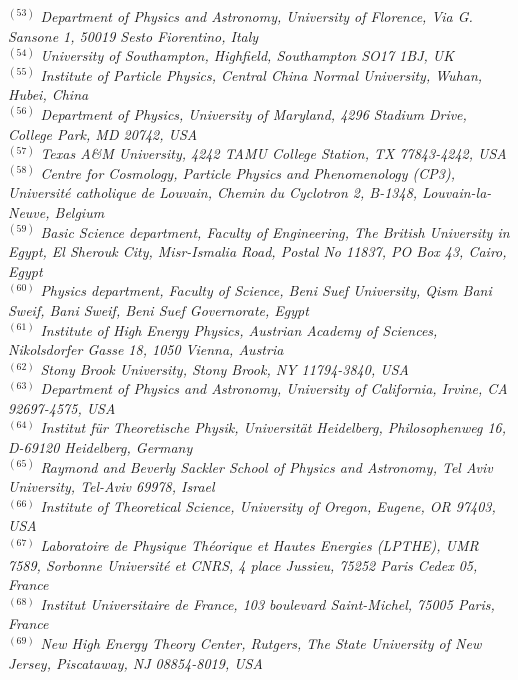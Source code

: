 {\begin{center}
$^{(53)}$ \emph{Department of Physics and Astronomy, University of Florence, Via G. Sansone 1, 50019 Sesto Fiorentino, Italy}\\
$^{(54)}$ \emph{University of Southampton, Highfield, Southampton SO17 1BJ, UK}\\
$^{(55)}$ \emph{Institute of Particle Physics, Central China Normal University, Wuhan, Hubei, China}\\
$^{(56)}$ \emph{Department of Physics, University of Maryland, 4296 Stadium Drive, College Park, MD  20742,  USA}\\
$^{(57)}$ \emph{Texas A\&M University, 4242 TAMU College Station, TX 77843-4242, USA}\\
$^{(58)}$ \emph{Centre for Cosmology, Particle Physics and Phenomenology (CP3), Universit\'e catholique de Louvain, Chemin du Cyclotron 2, B-1348, Louvain-la-Neuve, Belgium}\\
$^{(59)}$ \emph{Basic Science department, Faculty of Engineering, The British University in Egypt, El Sherouk City, Misr-Ismalia Road, Postal No 11837, PO Box 43, Cairo, Egypt}\\
$^{(60)}$ \emph{Physics department, Faculty of Science, Beni Suef University, Qism Bani Sweif, Bani Sweif, Beni Suef Governorate, Egypt}\\
$^{(61)}$ \emph{Institute of High Energy Physics, Austrian Academy of Sciences, Nikolsdorfer Gasse 18, 1050 Vienna, Austria}\\
$^{(62)}$ \emph{Stony Brook University, Stony Brook, NY 11794-3840, USA}\\
$^{(63)}$ \emph{Department of Physics and Astronomy, University of California, Irvine, CA 92697-4575, USA}\\
$^{(64)}$ \emph{Institut  f\"ur Theoretische Physik, Universit\"at Heidelberg, Philosophenweg 16, D-69120 Heidelberg, Germany}\\
$^{(65)}$ \emph{Raymond and Beverly Sackler School of Physics and Astronomy, Tel Aviv University, Tel-Aviv 69978, Israel}\\
$^{(66)}$ \emph{Institute of Theoretical Science, University of Oregon, Eugene, OR 97403, USA}\\
$^{(67)}$ \emph{Laboratoire de Physique Th\'eorique et Hautes Energies (LPTHE), UMR 7589, Sorbonne Universit\'e et CNRS, 4 place Jussieu, 75252 Paris Cedex 05, France}\\
$^{(68)}$ \emph{Institut Universitaire de France, 103 boulevard Saint-Michel, 75005 Paris, France}\\
$^{(69)}$ \emph{New High Energy Theory Center, Rutgers, The State University of New Jersey, Piscataway, NJ 08854-8019, USA}\\

\end{center}}
